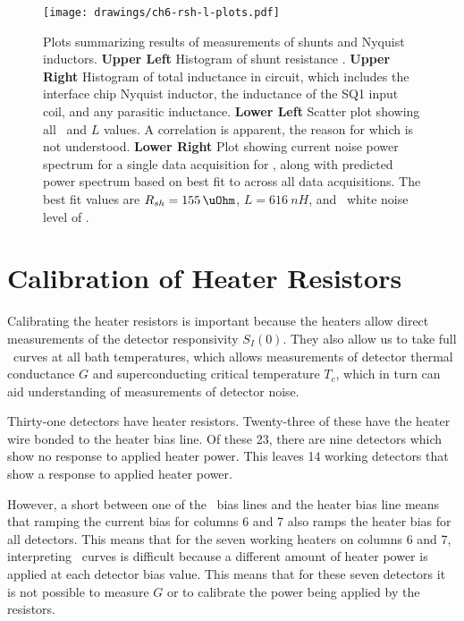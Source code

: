 \begin{figure*}
\texttt{[image: drawings/ch6-rsh-l-plots.pdf]}
\caption[Measurements of shunt resistors and Nyquist inductors]{
Plots summarizing results of measurements of shunts and Nyquist inductors.
\textbf{Upper Left} Histogram of shunt resistance \Rsh.
\textbf{Upper Right} Histogram of total inductance in circuit, which includes the interface chip Nyquist inductor, the inductance of the SQ1 input coil, and any parasitic inductance.
\textbf{Lower Left} Scatter plot showing all \Rsh\ and $L$ values. A correlation is apparent, the reason for which is not understood.
\textbf{Lower Right} Plot showing current noise power spectrum for a single data acquisition for , along with predicted power spectrum based on best fit to  across all data acquisitions. The best fit values are $\Rsh=\SI{155}{\uOhm}$, $L = \SI{616}{nH}$, and \SQUID\ white noise level of .}
\label{fig:rsh-l-plots}
\end{figure*}

\section{Calibration of Heater Resistors} \label{sec:heater-r}

Calibrating the heater resistors is important because the heaters allow direct measurements of the detector responsivity $S_I(0)$.
They also allow us to take full \IV\ curves at all bath temperatures, which allows measurements of detector thermal conductance $G$ and superconducting critical temperature $T_c$, which in turn can aid understanding of measurements of detector noise.

Thirty-one detectors have heater resistors.
Twenty-three of these have the heater wire bonded to the heater bias line.
Of these 23, there are nine detectors which show no response to applied heater power.
This leaves 14 working detectors that show a response to applied heater power.

However, a short between one of the \TES\ bias lines and the heater bias line means that ramping the current bias for columns 6 and 7 also ramps the heater bias for all detectors.
This means that for the seven working heaters on columns 6 and 7, interpreting \IV\ curves is difficult because a different amount of heater power is applied at each detector bias value.
This means that for these seven detectors it is not possible to measure $G$ or to calibrate the power being applied by the resistors.


